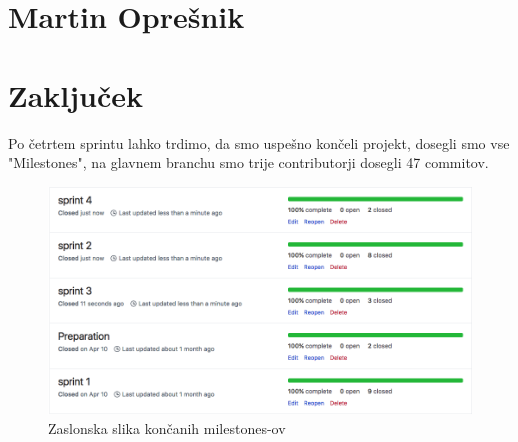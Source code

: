 \documentclass[a4paper,11pt]{article}
\begin{document}
\section{Martin Oprešnik}


\newpage
\section{Zaključek}
Po četrtem sprintu lahko trdimo, da smo uspešno končeli projekt, dosegli smo vse "Milestones", na glavnem branchu smo trije contributorji dosegli 47 commitov.


\begin{figure}[h]
\caption{Zaslonska slika končanih milestones-ov}
\centering
\includegraphics[width=1\textwidth]{closedsprints}
\end{figure}
\end{document}
